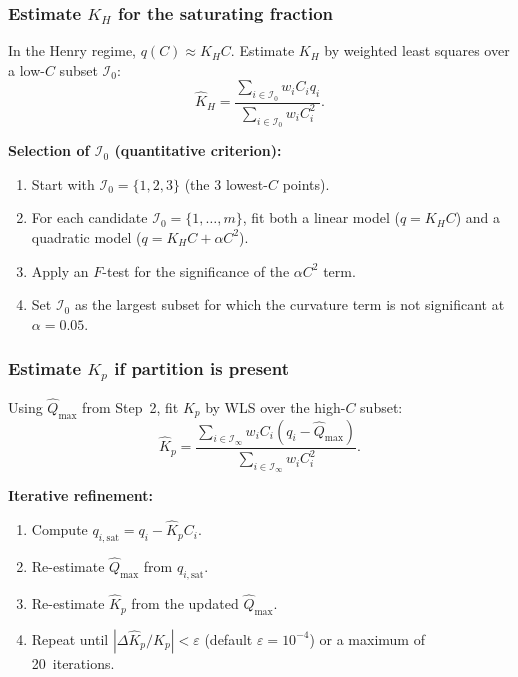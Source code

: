 \documentclass[12pt]{article}
\begin{document}
\subsubsection{Estimate $K_H$ for the saturating fraction}
\label{sec:henry_region}

In the Henry regime, $q(C)\approx K_H C$.  Estimate $K_H$ by weighted
least squares over a low-$C$ subset $\mathcal{I}_0$:
\begin{equation}
  \widehat{K}_H =
  \frac{\sum_{i\in\mathcal{I}_0} w_i C_i q_i}
       {\sum_{i\in\mathcal{I}_0} w_i C_i^2}.
  \label{eq:KH_fit}
\end{equation}

\textbf{Selection of $\mathcal{I}_0$ (quantitative criterion):}
\begin{enumerate}[nosep]
  \item Start with $\mathcal{I}_0 = \{1,2,3\}$ (the 3 lowest-$C$ points).
  \item For each candidate $\mathcal{I}_0=\{1,\dots,m\}$, fit both a linear model ($q=K_H C$) and a quadratic model ($q=K_H C + \alpha C^2$).
  \item Apply an $F$-test for the significance of the $\alpha C^2$ term.
  \item Set $\mathcal{I}_0$ as the largest subset for which the  curvature term is not significant at $\alpha=0.05$.
\end{enumerate}

\subsubsection{Estimate $K_p$ if partition is present}

Using $\widehat{Q}_{\max}$ from Step~2, fit $K_p$ by WLS over the
high-$C$ subset:
\begin{equation}
  \widehat{K}_p =
  \frac{\sum_{i\in\mathcal{I}_\infty} w_i C_i (q_i-\widehat{Q}_{\max})}
       {\sum_{i\in\mathcal{I}_\infty} w_i C_i^2}.
  \label{eq:Kp_fit}
\end{equation}

\textbf{Iterative refinement:}
\begin{enumerate}[nosep]
  \item Compute $q_{i,\mathrm{sat}}=q_i-\widehat{K}_p C_i$.
  \item Re-estimate $\widehat{Q}_{\max}$ from $q_{i,\mathrm{sat}}$.
  \item Re-estimate $\widehat{K}_p$ from the updated  $\widehat{Q}_{\max}$.
  \item Repeat until $|\Delta\widehat{K}_p/\widehat{K}_p|<\varepsilon$ (default $\varepsilon=10^{-4}$) or a maximum of 20~iterations.
\end{enumerate}
\end{document}

